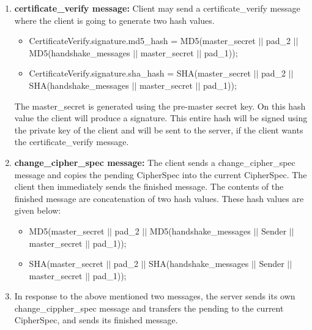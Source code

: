 \documentclass[11pt]{article}
\begin{document}
\begin{enumerate}
    \item \textbf{certificate\_verify message:} Client may send a certificate\_verify message where the client is going to generate two hash values.
    \begin{itemize}
        \item CertificateVerify.signature.md5\_hash = MD5(master\_secret $||$ pad\_2 $||$ MD5(handshake\_messages $||$ master\_secret $||$ pad\_1));
        \item CertificateVerify.signature.sha\_hash = SHA(master\_secret $||$ pad\_2 $||$ SHA(handshake\_messages $||$ master\_secret $||$ pad\_1));
    \end{itemize}
    The master\_secret is generated using the pre-master secret key. On this hash value the client will produce a signature. This entire hash will be signed using the private key of the client and will be sent to the server, if the client wants the certificate\_verify message.

    \item \textbf{change\_cipher\_spec message:} The client sends a change\_cipher\_spec message and copies the pending CipherSpec into the current CipherSpec. The client then immediately sends the finished message. The contents of the finished message are concatenation of two hash values. These hash values are given below:
    \begin{itemize}
        \item MD5(master\_secret $||$ pad\_2 $||$ MD5(handshake\_messages $||$ Sender $||$ master\_secret $||$ pad\_1));
        \item SHA(master\_secret $||$ pad\_2 $||$ SHA(handshake\_messages $||$ Sender $||$ master\_secret $||$ pad\_1));
    \end{itemize}

    \item  In response to the above mentioned two messages, the server sends its own change\_cippher\_spec message and transfers the pending to the current CipherSpec, and sends its finished message.
\end{enumerate}
\end{document}
